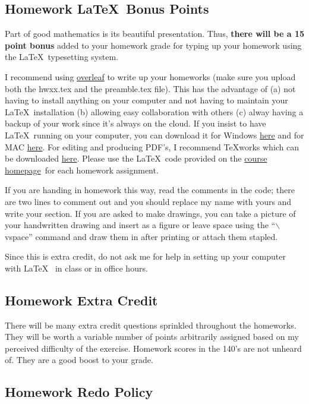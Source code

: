 \documentclass[12pt]{article}
\newcommand{\ingreen}[1]{\color{green}\textbf{#1} \color{black}}
\newcommand{\coursewebpage}{\href{https://github.com/kapelner/QC_Math_241_Spring_2015}{course homepage}}
\newcommand{\qu}[1]{``#1''}
\begin{document}
\subsection*{Homework \LaTeX~Bonus Points}

Part of good mathematics is its beautiful presentation. Thus, \ingreen{there will be a 15 point bonus} added to your homework grade  for typing up your homework using the \LaTeX ~typesetting system. 

I recommend using \href{http://overleaf.com}{overleaf} to write up your homeworks (make sure you upload both the hwxx.tex and the preamble.tex file). This has the advantage of (a) not having to install anything on your computer and not having to maintain your \LaTeX ~installation (b) allowing easy collaboration with others (c) alway having a backup of your work since it's always on the cloud. If you insist to have \LaTeX ~running on your computer, you can download it for Windows \href{http://www.miktex.org/download}{here} and for MAC \href{http://www.tug.org/mactex/}{here}. For editing and producing PDF's, I recommend \TeX works which can be downloaded \href{http://www.tug.org/texworks/#Getting_TeXworks}{here}. Please use the \LaTeX ~code provided on the \coursewebpage ~for each homework assignment. 

If you are handing in homework this way, read the comments in the code; there are two lines to comment out and you should replace my name with yours and write your section. If you are asked to make drawings, you can take a picture of your handwritten drawing and insert as a figure or leave space using the \qu{$\backslash$vspace} command and draw them in after printing or attach them stapled.

Since this is extra credit, do not ask me for help in setting up your computer with \LaTeX~ in class or in office hours.

\subsection*{Homework Extra Credit}

There will be many extra credit questions sprinkled throughout the homeworks. They will be worth a variable number of points arbitrarily assigned based on my perceived difficulty of the exercise. Homework scores in the 140's are not unheard of. They are a good boost to your grade.

\subsection*{Homework Redo Policy}
\end{document}
